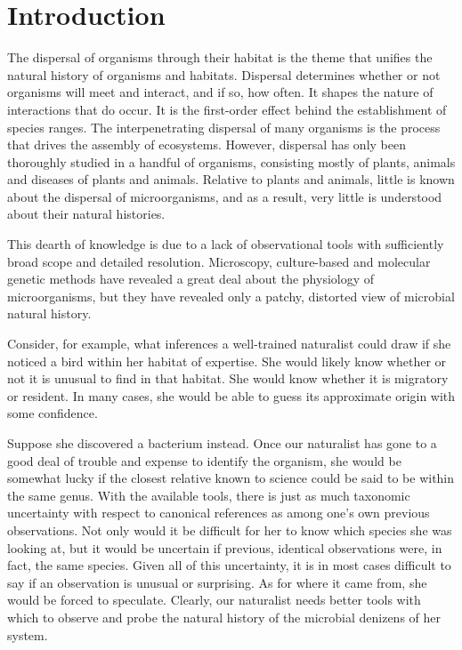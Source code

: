\section{Introduction}

The dispersal of organisms through their habitat is the theme that unifies the natural history of organisms and habitats. Dispersal determines whether or not organisms will meet and interact, and if so, how often. It shapes the nature of interactions that do occur. It is the first-order effect behind the establishment of species ranges. The interpenetrating dispersal of many organisms is the process that drives the assembly of ecosystems. However, dispersal has only been thoroughly studied in a handful of organisms, consisting mostly of plants, animals and diseases of plants and animals. Relative to plants and animals, little is known about the dispersal of microorganisms, and as a result, very little is understood about their natural histories. 

This dearth of knowledge is due to a lack of observational tools with sufficiently broad scope and detailed resolution. Microscopy, culture-based and molecular genetic methods have revealed a great deal about the physiology of microorganisms, but they have revealed only a patchy, distorted view of microbial natural history.

Consider, for example, what inferences a well-trained naturalist could draw if she noticed a bird within her habitat of expertise. She would likely know whether or not it is unusual to find in that habitat. She would know whether it is migratory or resident. In many cases, she would be able to guess its approximate origin with some confidence. 

Suppose she discovered a bacterium instead. Once our naturalist has gone to a good deal of trouble and expense to identify the organism, she would be somewhat lucky if the closest relative known to science could be said to be within the same genus. With the available tools, there is just as much taxonomic uncertainty with respect to canonical references as among one's own previous observations. Not only would it be difficult for her to know which species she was looking at, but it would be uncertain if previous, identical observations were, in fact, the same species. Given all of this uncertainty, it is in most cases difficult to say if an observation is unusual or surprising. As for where it came from, she would be forced to speculate. Clearly, our naturalist needs better tools with which to observe and probe the natural history of the microbial denizens of her system.

